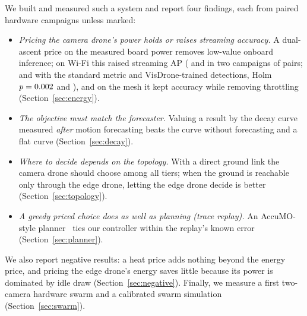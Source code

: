 \documentclass[conference]{IEEEtran}
\begin{document}
We built and measured such a system and report four findings, each from paired hardware campaigns unless marked:
\begin{itemize}
\item \emph{Pricing the camera drone's power holds or raises streaming accuracy.} A dual-ascent price on the measured
board power removes low-value onboard inference; on Wi-Fi this raised streaming AP (\EnGain{} and \EnRepGain{} in two
campaigns of \EnPairs{} pairs; \EnVdGain{} and \EnRepVdGain{} with the standard metric and VisDrone-trained detections,
Holm $p=0.002{}$ and \EnRepVdHolm{}), and on the mesh it kept accuracy while removing throttling
(Section~\ref{sec:energy}).
\item \emph{The objective must match the forecaster.} Valuing a result by the decay curve measured \emph{after} motion
forecasting beats the curve without forecasting and a flat curve (Section~\ref{sec:decay}).
\item \emph{Where to decide depends on the topology.} With a direct ground link the camera drone should choose among all
tiers; when the ground is reachable only through the edge drone, letting the edge drone decide is better
(Section~\ref{sec:topology}).
\item \emph{A greedy priced choice does as well as planning (trace replay).} An AccuMO-style planner~\cite{Kong_2023}
ties our controller within the replay's known error (Section~\ref{sec:planner}).
\end{itemize}
We also report negative results: a heat price adds nothing beyond the energy price, and pricing the edge drone's energy
saves little because its power is dominated by idle draw (Section~\ref{sec:negative}). Finally, we measure a first
two-camera hardware swarm and a calibrated swarm simulation (Section~\ref{sec:swarm}).
\end{document}
